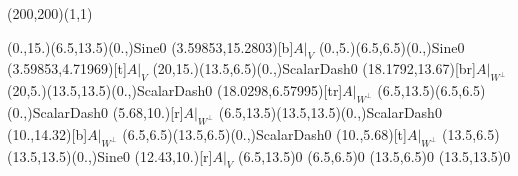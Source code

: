 \unitlength=1bp%

\begin{feynartspicture}(200,200)(1,1)

\FADiagram{}
\FAProp(0.,15.)(6.5,13.5)(0.,){Sine}{0}
\FALabel(3.59853,15.2803)[b]{$A|_V$}
\FAProp(0.,5.)(6.5,6.5)(0.,){Sine}{0}
\FALabel(3.59853,4.71969)[t]{$A|_V$}
\FAProp(20,15.)(13.5,6.5)(0.,){ScalarDash}{0}
\FALabel(18.1792,13.67)[br]{$A|_{W^\perp}$}
\FAProp(20,5.)(13.5,13.5)(0.,){ScalarDash}{0}
\FALabel(18.0298,6.57995)[tr]{$A|_{W^\perp}$}
\FAProp(6.5,13.5)(6.5,6.5)(0.,){ScalarDash}{0}
\FALabel(5.68,10.)[r]{$A|_{W^\perp}$}
\FAProp(6.5,13.5)(13.5,13.5)(0.,){ScalarDash}{0}
\FALabel(10.,14.32)[b]{$A|_{W^\perp}$}
\FAProp(6.5,6.5)(13.5,6.5)(0.,){ScalarDash}{0}
\FALabel(10.,5.68)[t]{$A|_{W^\perp}$}
\FAProp(13.5,6.5)(13.5,13.5)(0.,){Sine}{0}
\FALabel(12.43,10.)[r]{$A|_V$}
\FAVert(6.5,13.5){0}
\FAVert(6.5,6.5){0}
\FAVert(13.5,6.5){0}
\FAVert(13.5,13.5){0}
\end{feynartspicture}

